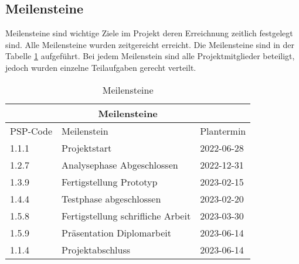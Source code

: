 \subsection{Meilensteine}

Meilensteine sind wichtige Ziele im Projekt deren Erreichnung zeitlich festgelegt sind. Alle Meilensteine wurden zeitgereicht erreicht. Die Meilensteine sind in der Tabelle \ref{tab:meilensteine} aufgeführt. Bei jedem Meilenstein sind alle Projektmitglieder beteiligt, jedoch wurden einzelne Teilaufgaben gerecht verteilt.

\begin{table}[H]
  \begin{center}
    \begin{tabular} {lll}
      \multicolumn{3}{c}{\textbf{Meilensteine}}                 \\
      \toprule
      PSP-Code & Meilenstein                       & Plantermin \\
      \midrule
      1.1.1    & Projektstart                      & 2022-06-28 \\
      1.2.7    & Analysephase Abgeschlossen        & 2022-12-31 \\
      1.3.9    & Fertigstellung Prototyp           & 2023-02-15 \\
      1.4.4    & Testphase abgeschlossen           & 2023-02-20 \\
      1.5.8    & Fertigstellung schrifliche Arbeit & 2023-03-30 \\
      1.5.9    & Präsentation Diplomarbeit         & 2023-06-14 \\
      1.1.4    & Projektabschluss                  & 2023-06-14 \\
      \bottomrule
    \end{tabular}
    \caption{Meilensteine}
    \label{tab:meilensteine}
  \end{center}
\end{table}
